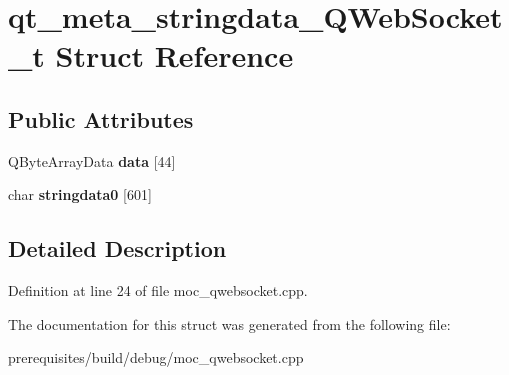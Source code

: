 \hypertarget{structqt__meta__stringdata___q_web_socket__t}{}\section{qt\+\_\+meta\+\_\+stringdata\+\_\+\+Q\+Web\+Socket\+\_\+t Struct Reference}
\label{structqt__meta__stringdata___q_web_socket__t}
\subsection*{Public Attributes}
\begin{DoxyCompactItemize}
\item 
\mbox{\label{structqt__meta__stringdata___q_web_socket__t_a16b8ce11ad08330a7c1127527161bc23}} 
Q\+Byte\+Array\+Data {\bfseries data} \mbox{[}44\mbox{]}
\item 
\mbox{\label{structqt__meta__stringdata___q_web_socket__t_a2df8f22584bfb2aac26519e3190d99a2}} 
char {\bfseries stringdata0} \mbox{[}601\mbox{]}
\end{DoxyCompactItemize}


\subsection{Detailed Description}


Definition at line 24 of file moc\+\_\+qwebsocket.\+cpp.



The documentation for this struct was generated from the following file\+:\begin{DoxyCompactItemize}
\item 
prerequisites/build/debug/moc\+\_\+qwebsocket.\+cpp\end{DoxyCompactItemize}
